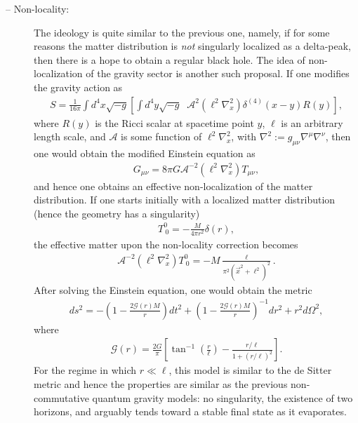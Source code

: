 \documentclass[12pt]{article}
\newcommand{\2}{$^2$}
\newcommand{\3}{$^3$}
\newcommand{\4}{$_4$}
\newcommand{\5}{$_5$}
\begin{document}
\begin{description}
\item[-- Non-locality:] The ideology is quite similar to the previous one, namely, if for some reasons the matter distribution is \emph{not} singularly localized as a delta-peak, then there is a hope to obtain a regular black hole. The idea of non-localization of the gravity sector \cite{1202.2102} is another such proposal. If one modifies the gravity action as
\begin{eqnarray}
S = \frac{1}{16\pi} \int d^{4}x \sqrt{-g} \left[ \int d^{4}y \sqrt{-g}\;\; \mathcal{A}^{2}\left( \ell^{2} \nabla_{x}^{2} \right) \delta^{(4)}\left( x - y \right) R(y)\right],
\end{eqnarray}
where $R(y)$ is the Ricci scalar at spacetime point $y$, $\ell$ is an arbitrary length scale, and $\mathcal{A}$ is some function of $\ell^{2} \nabla_{x}^{2}$, with $\nabla^2 := g_{\mu\nu}\nabla^\mu \nabla^\nu$, then one would obtain the modified Einstein equation as
\begin{eqnarray}
G_{\mu\nu} = 8\pi G \mathcal{A}^{-2}\left({\ell^{2} \nabla_{x}^{2}}\right) T_{\mu\nu},
\end{eqnarray}
and hence one obtains an effective non-localization of the matter distribution. If one starts initially with a localized matter distribution (hence the geometry has a singularity)
\begin{eqnarray}
T^{0}_{~0} = - \frac{M}{4\pi r^{2}} \delta(r),
\end{eqnarray}
the effective matter upon the non-locality correction becomes
\begin{eqnarray}
\mathcal{A}^{-2}\left({\ell^{2} \nabla_{x}^{2}}\right) T^{0}_{~0} = - M \frac{\ell}{\pi^{2} (\vec{x}^{2} + \ell^{2})^{2}}.
\end{eqnarray}
After solving the Einstein equation, one would obtain the metric
\begin{eqnarray}
ds^{2} = - \left(1 - \frac{2 \mathcal{G}(r) M}{r} \right) dt^{2} + \left(1 - \frac{2 \mathcal{G}(r) M}{r} \right)^{-1} dr^{2} + r^{2} d\Omega^{2},
\end{eqnarray}
where
\begin{eqnarray}
\mathcal{G}(r) = \frac{2G}{\pi} \left[ \tan^{-1} \left(\frac{r}{\ell}\right) - \frac{r/\ell}{1+(r/\ell)^{2}} \right].
\end{eqnarray}
For the regime in which $r \ll \ell$, this model is similar to the de Sitter metric and hence the properties are similar as the previous non-commutative quantum gravity models: no singularity, the existence of two horizons, and arguably tends toward a stable final state as it evaporates.
\end{description}
\end{document}
